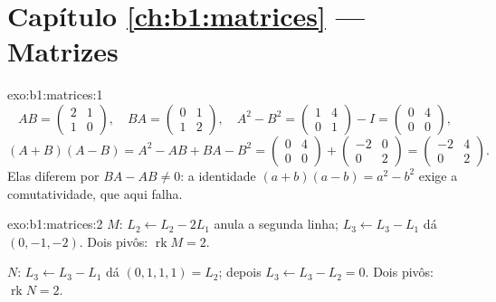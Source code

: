 \section*{Capítulo \ref{ch:b1:matrices} --- Matrizes}

\begin{solution}{exo:b1:matrices:1}
\[
AB = \begin{pmatrix} 2 & 1\\ 1 & 0\end{pmatrix},
\quad
BA = \begin{pmatrix} 0 & 1\\ 1 & 2\end{pmatrix},
\quad
A^2 - B^2 = \begin{pmatrix} 1 & 4\\ 0 & 1\end{pmatrix} - I
= \begin{pmatrix} 0 & 4\\ 0 & 0\end{pmatrix},
\]
\[
(A+B)(A-B) = A^2 - AB + BA - B^2
= \begin{pmatrix} 0 & 4\\ 0 & 0\end{pmatrix} +
\begin{pmatrix} -2 & 0\\ 0 & 2 \end{pmatrix}
= \begin{pmatrix} -2 & 4\\ 0 & 2\end{pmatrix}.
\]
Elas diferem por $BA - AB \neq 0$: a identidade $(a+b)(a-b) = a^2 -
b^2$ exige a comutatividade,
que aqui falha.
\end{solution}

\begin{solution}{exo:b1:matrices:2}
$M$: $L_2 \leftarrow L_2 - 2L_1$ anula a segunda linha; $L_3
\leftarrow L_3 - L_1$ dá $(0, -1, -2)$. Dois pivôs:
$\operatorname{rk} M = 2$.

$N$: $L_3 \leftarrow L_3 - L_1$ dá $(0,1,1,1) = L_2$; depois $L_3
\leftarrow L_3 - L_2 = 0$. Dois pivôs: $\operatorname{rk} N = 2$.
\end{solution}

